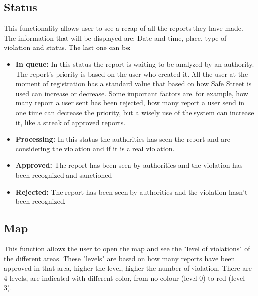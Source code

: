 \documentclass[12pt,a4paper]{report}
\begin{document}
		\subsection{Status}
			This functionality allows user to see a recap of all the reports they have made. The information that will be displayed
			are: Date and time, place, type of violation and status. The last one can be:
			\begin{itemize}
				\item \textbf{In queue:}
					In this status the report is waiting to be analyzed by an authority. The report's priority is based on
					the user who created it. All the user at the moment of registration has a standard value that based on
					how Safe Street is used can increase or decrease. Some important factors are, for example, 
					how many report a user sent has been rejected, how many report a user send in one time can decrease
					the priority, but a wisely use of the system can increase it, like a streak of approved reports.
				\item \textbf{Processing:}
					In this status the authorities has seen the report and are considering the violation and if it is a real
					violation.
				\item \textbf{Approved:}
					The report has been seen by authorities and the violation has been recognized and sanctioned 
				\item \textbf{Rejected:}
					The report has been seen by authorities and the violation hasn't been recognized.
			\end{itemize}
		\subsection{Map}
			This function allows the user to open the map and see the "level of violations" of the different areas. These "levels" are
			based on how many reports have been approved in that area, higher the level, higher the number of violation.
			There are 4 levels, are indicated with different color, from no colour (level 0) to red (level 3).
			
\end{document}
